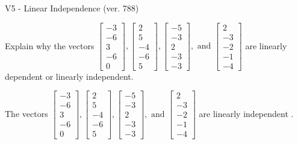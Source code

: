 \begin{exercise}
  \begin{exerciseTitle}V5 - Linear Independence (ver. 788)\end{exerciseTitle}
  \begin{exerciseStatement}
    Explain why the vectors \(\left[\begin{array}{r}
-3 \\
-6 \\
3 \\
-6 \\
0
\end{array}\right] , \left[\begin{array}{r}
2 \\
5 \\
-4 \\
-6 \\
5
\end{array}\right] , \left[\begin{array}{r}
-5 \\
-3 \\
2 \\
-3 \\
-3
\end{array}\right] , \text{ and } \left[\begin{array}{r}
2 \\
-3 \\
-2 \\
-1 \\
-4
\end{array}\right]\) are linearly dependent or linearly independent.	


  \end{exerciseStatement}
  \begin{exerciseAnswer}
   The vectors \(\left[\begin{array}{r}
-3 \\
-6 \\
3 \\
-6 \\
0
\end{array}\right] , \left[\begin{array}{r}
2 \\
5 \\
-4 \\
-6 \\
5
\end{array}\right] , \left[\begin{array}{r}
-5 \\
-3 \\
2 \\
-3 \\
-3
\end{array}\right] , \text{ and } \left[\begin{array}{r}
2 \\
-3 \\
-2 \\
-1 \\
-4
\end{array}\right]\) are 
  	 linearly independent  .
  


  \end{exerciseAnswer}
\end{exercise}